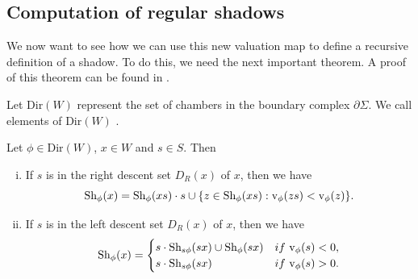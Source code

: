 \documentclass[11pt]{article}
\begin{document}






\subsection{Computation of regular shadows}

We now want to see how we can use this new valuation map to define a recursive definition of a shadow. To do this, we need the next important theorem. A proof of this theorem can be found in \cite[pp.142-143]{SHA}. 

Let Dir$(W)$ represent the set of chambers in the boundary complex $\partial\Sigma$. We call elements of Dir$(W)$ . 

\begin{theorem} \label{alg}
    Let $\phi\in$Dir$(W)$, $x\in W$ and $s\in S$. Then
    \begin{enumerate}[(i)]
        \item If $s$ is in the right descent set $D_R(x)$ of $x$, then we have
        \[\textnormal{Sh}_\phi(x)=\textnormal{Sh}_\phi(xs)\cdot s \cup \{z\in \textnormal{Sh}_\phi(xs):\textnormal{v}_\phi(zs)<\textnormal{v}_\phi(z)\}.\]
        \item If $s$ is in the left descent set $D_R(x)$ of $x$, then we have
        \[\textnormal{Sh}_\phi(x)=\begin{cases}
            s\cdot \textnormal{Sh}_{s\phi}(sx)\cup \textnormal{Sh}_\phi(sx) &if\textnormal{ v}_\phi(s)<0,\\
            s\cdot \textnormal{Sh}_{s\phi}(sx) &if \textnormal{ v}_\phi(s)>0.\\
        \end{cases}\]
    \end{enumerate}
\end{theorem}
\end{document}
